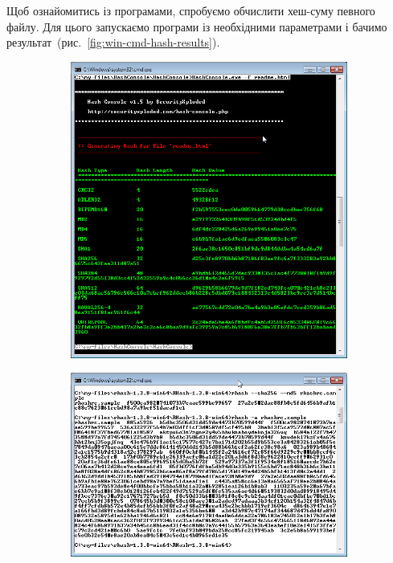 \documentclass[
	a4paper,
	oneside,
	BCOR = 10mm,
	DIV = 12,
	12pt,
	headings = normal,
]{scrartcl}
\newlength{\gridunitwidth}
\begin{document}
			Щоб ознайомитись із програмами, спробуємо обчислити хеш-суму певного файлу. Для цього запускаємо програми із необхідними параметрами і бачимо результат~(рис.~\ref{fig:win-cmd-hash-results}).

			\begin{figure}[!htbp]
				\begin{subfigure}[b]{6\gridunitwidth - 1em / 2}
					\centering
					\includegraphics[width = \columnwidth]{./assets/01.png}
					\caption{}
					\label{subfig:win-cmd-hash-results-hashconsole}
				\end{subfigure}%
				\hspace{1em}
				\begin{subfigure}[b]{6\gridunitwidth - 1em / 2}
					\centering
					\includegraphics[width = \columnwidth]{./assets/02.png}

\end{subfigure}
\end{figure}
\end{document}
